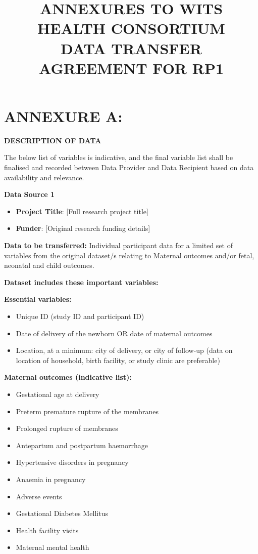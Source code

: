 \documentclass[12pt,letterpaper]{article}
\title{\textbf{ANNEXURES TO WITS HEALTH CONSORTIUM\\DATA TRANSFER AGREEMENT FOR RP1}}
\author{}
\date{}
\begin{document}
\maketitle

\section*{ANNEXURE A:}

\textbf{DESCRIPTION OF DATA}

The below list of variables is indicative, and the final variable list shall be finalised and recorded between Data Provider and Data Recipient based on data availability and relevance.

\textbf{Data Source 1}

\begin{itemize}
    \item \textbf{Project Title}: [Full research project title]
    \item \textbf{Funder}: [Original research funding details]
\end{itemize}

\textbf{Data to be transferred:} Individual participant data for a limited set of variables from the original dataset/s relating to Maternal outcomes and/or fetal, neonatal and child outcomes.

\textbf{Dataset includes these important variables:}

\textbf{Essential variables:}
\begin{itemize}
    \item Unique ID (study ID and participant ID)
    \item Date of delivery of the newborn OR date of maternal outcomes
    \item Location, at a minimum: city of delivery, or city of follow-up (data on location of household, birth facility, or study clinic are preferable)
\end{itemize}

\textbf{Maternal outcomes (indicative list):}
\begin{itemize}
    \item Gestational age at delivery
    \item Preterm premature rupture of the membranes
    \item Prolonged rupture of membranes
    \item Antepartum and postpartum haemorrhage
    \item Hypertensive disorders in pregnancy
    \item Anaemia in pregnancy
    \item Adverse events
    \item Gestational Diabetes Mellitus
    \item Health facility visits
    \item Maternal mental health
\end{itemize}
\end{document}
